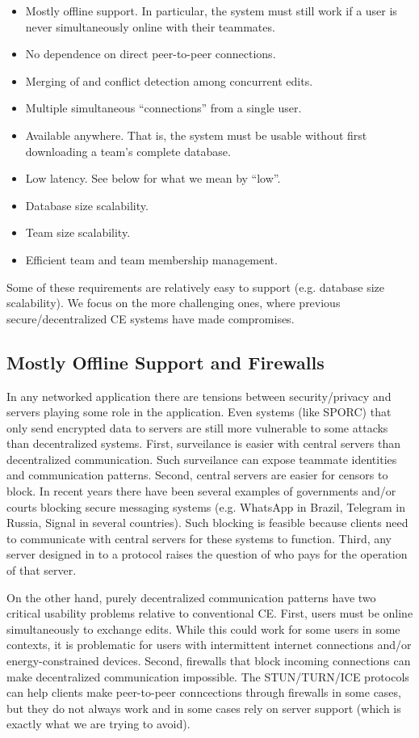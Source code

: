 \documentclass{article}
\begin{document}
\begin{itemize}
\item Mostly offline support.
  In particular, the system must still work if a user is never simultaneously online with their teammates.
\item No dependence on direct peer-to-peer connections.
\item Merging of and conflict detection among concurrent edits.
\item Multiple simultaneous ``connections'' from a single user.
\item Available anywhere.
  That is, the system must be usable without first downloading a team's complete database.
\item Low latency.
  See below for what we mean by ``low''.
\item Database size scalability.
\item Team size scalability.
\item Efficient team and team membership management.
\end{itemize}

Some of these requirements are relatively easy to support (e.g. database size scalability).
We focus on the more challenging ones, where previous secure{\slash}decentralized CE systems have made compromises.

\subsection{Mostly Offline Support and Firewalls}

In any networked application there are tensions between security{\slash}privacy and servers playing some role in the application.
Even systems (like SPORC) that only send encrypted data to servers are still more vulnerable to some attacks than decentralized systems.
First, surveilance is easier with central servers than decentralized communication.
Such surveilance can expose teammate identities and communication patterns.
Second, central servers are easier for censors to block.
In recent years there have been several examples of governments and{\slash}or courts blocking secure messaging systems (e.g. WhatsApp in Brazil, Telegram in Russia, Signal in several countries).
Such blocking is feasible because clients need to communicate with central servers for these systems to function.
Third, any server designed in to a protocol raises the question of who pays for the operation of that server.

On the other hand, purely decentralized communication patterns have two critical usability problems relative to conventional CE.
First, users must be online simultaneously to exchange edits\footnotemark{}.
While this could work for some users in some contexts, it is problematic for users with intermittent internet connections and/or energy-constrained devices.
Second, firewalls that block incoming connections can make decentralized communication impossible.
The STUN/TURN/ICE protocols can help clients make peer-to-peer conncections through firewalls in some cases, but they do not always work and in some cases rely on server support (which is exactly what we are trying to avoid).
\end{document}
